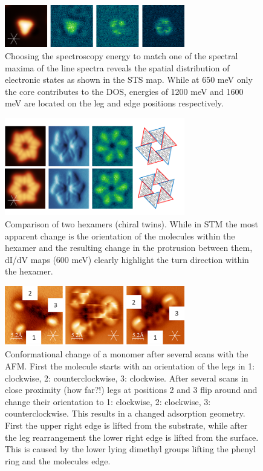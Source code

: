 \begin{figure}[] \centering
	\includegraphics[width=0.7\textwidth]{./images/hbbnc-maps}
	\caption{Choosing the spectroscopy energy to match one of the spectral maxima of the line spectra reveals the spatial distribution of electronic states as shown in the STS map. While at 650 meV only the core contributes to the DOS, energies of 1200 meV and 1600 meV are located on the leg and edge positions respectively.}
	\label{}
\end{figure}

\begin{figure}[] \centering
	\includegraphics[width=0.7\textwidth]{./images/hbbnc-maps2}
	\caption{Comparison of two hexamers (chiral twins). While in STM the most apparent change is the orientation of the molecules within the hexamer and the resulting change in the protrusion between them, dI/dV maps (600 meV) clearly highlight the turn direction within the hexamer.}
	\label{}
\end{figure}

\begin{figure}[] \centering
	\includegraphics[width=0.7\textwidth]{./images/hbbnc-ag-111-leg-flip}
	\caption{Conformational change of a monomer after several scans with the AFM. First the molecule starts with an orientation of the legs in 1: clockwise, 2: counterclockwise, 3: clockwise. After several scans in close proximity (how far?!) legs at positions 2 and 3 flip around and change their orientation to 1: clockwise, 2: clockwise, 3: counterclockwise. This results in a changed adsorption geometry. First the upper right edge is lifted from the substrate, while after the leg rearrangement the lower right edge is lifted from the surface. This is caused by the lower lying dimethyl groups lifting the phenyl ring and the molecules edge.}
	\label{}
\end{figure}

